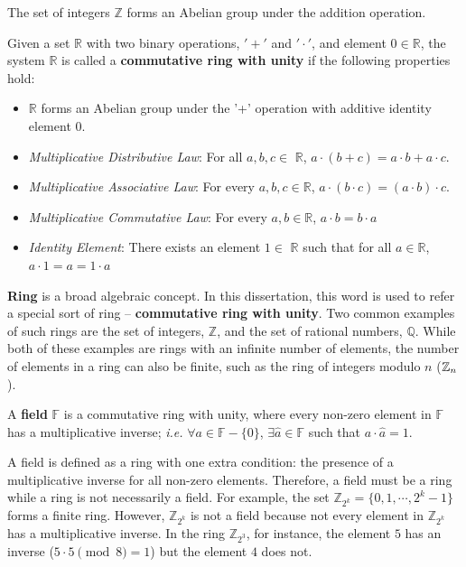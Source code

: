 The set of integers $\mathbb{Z}$ forms an Abelian group under the addition operation. 

\begin{Definition}
Given a set $\mathbb{R}$ with two binary operations, $'+'$ and $'\cdot'$, 
and element $0 \in \mathbb{R}$, the system $\mathbb{R}$ is called a {\bf commutative ring with unity} if the following properties hold:
\begin{itemize}
\item $\mathbb{R}$ forms an Abelian group under the '+' operation with additive identity element $0$.
\item {\it Multiplicative Distributive Law}: For all $a, b, c \in$ $\mathbb{R}$, $a\cdot (b + c) = a\cdot b + a\cdot c$.
\item {\it Multiplicative Associative Law}: For every $a, b, c\in \mathbb{R}$, $a\cdot (b\cdot c) = (a\cdot b)\cdot c$. 
\item {\it Multiplicative Commutative Law}: For every $a,b \in \mathbb{R}$, $a\cdot b = b\cdot a$
\item {\it Identity Element}: There exists an element $1 \in$ $\mathbb{R}$ 
such that for all $a \in \mathbb{R}$, $a\cdot 1 = a =1\cdot a$
\end{itemize}
\end{Definition}

{\bf Ring} is a broad algebraic concept. In this dissertation, this word is used to refer a special 
sort of ring -- {\bf commutative ring with unity}. Two common 
examples of such rings are the set of integers, $\mathbb{Z}$, and the set of 
rational numbers, $\mathbb{Q}$. While both of these examples are
rings with an infinite number of elements, the number of elements in a ring 
can also be finite, such as the ring of integers modulo $n$ (${\mathbb{Z}}_n$).

\begin{Definition}
A {\bf field} $\mathbb{F}$ is a commutative ring with unity, where every
non-zero element in $\mathbb{F}$ has a multiplicative inverse; {\it i.e.} $\forall
a \in \mathbb{F} - \{0\}$, $\exists \hat{a} \in \mathbb{F}$ such that $ a \cdot
\hat{a} = 1$.
\end{Definition}

A field is defined as a ring with one extra condition: the presence of a 
multiplicative inverse for all non-zero elements.
Therefore, a field must be a ring while a ring is not necessarily a field.
For example, the set $\mathbb{Z}_{2^k} = \{0,1,\cdots, 2^k-1\}$ forms a finite ring.
However, $\mathbb{Z}_{2^k}$ is not a field because not every element in
$\mathbb{Z}_{2^k}$ has a multiplicative inverse. 
In the ring $\mathbb{Z}_{2^3}$, for 
instance, the element $5$ has an inverse ($5\cdot5\pmod{8}=1$) but the element $4$
does not.

